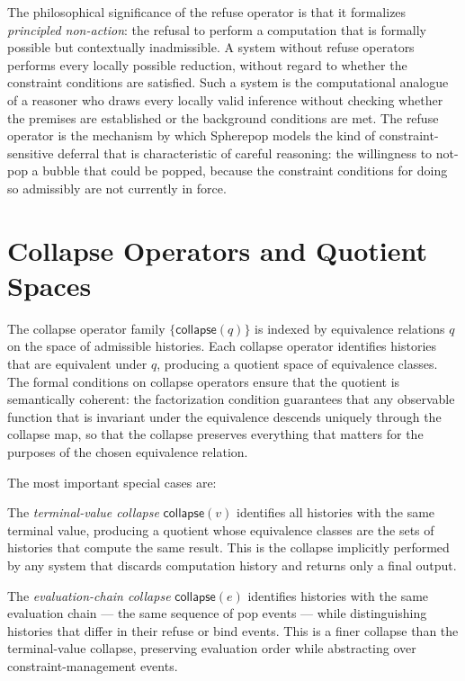 \documentclass[12pt,openany]{book}
\theoremstyle{plain}
\theoremstyle{definition}
\theoremstyle{remark}
\newcommand{\scollapse}[1]{\mathsf{collapse}\!\left(#1\right)}
\begin{document}
The philosophical significance of the refuse operator is that it formalizes \emph{principled non-action}: the refusal to perform a computation that is formally possible but contextually inadmissible. A system without refuse operators performs every locally possible reduction, without regard to whether the constraint conditions are satisfied. Such a system is the computational analogue of a reasoner who draws every locally valid inference without checking whether the premises are established or the background conditions are met. The refuse operator is the mechanism by which Spherepop models the kind of constraint-sensitive deferral that is characteristic of careful reasoning: the willingness to not-pop a bubble that could be popped, because the constraint conditions for doing so admissibly are not currently in force.

\section{Collapse Operators and Quotient Spaces}

The collapse operator family $\{\scollapse{q}\}$ is indexed by equivalence relations $q$ on the space of admissible histories. Each collapse operator identifies histories that are equivalent under $q$, producing a quotient space of equivalence classes. The formal conditions on collapse operators ensure that the quotient is semantically coherent: the factorization condition guarantees that any observable function that is invariant under the equivalence descends uniquely through the collapse map, so that the collapse preserves everything that matters for the purposes of the chosen equivalence relation.

The most important special cases are:

The \emph{terminal-value collapse} $\scollapse{v}$ identifies all histories with the same terminal value, producing a quotient whose equivalence classes are the sets of histories that compute the same result. This is the collapse implicitly performed by any system that discards computation history and returns only a final output.

The \emph{evaluation-chain collapse} $\scollapse{e}$ identifies histories with the same evaluation chain — the same sequence of pop events — while distinguishing histories that differ in their refuse or bind events. This is a finer collapse than the terminal-value collapse, preserving evaluation order while abstracting over constraint-management events.
\end{document}

